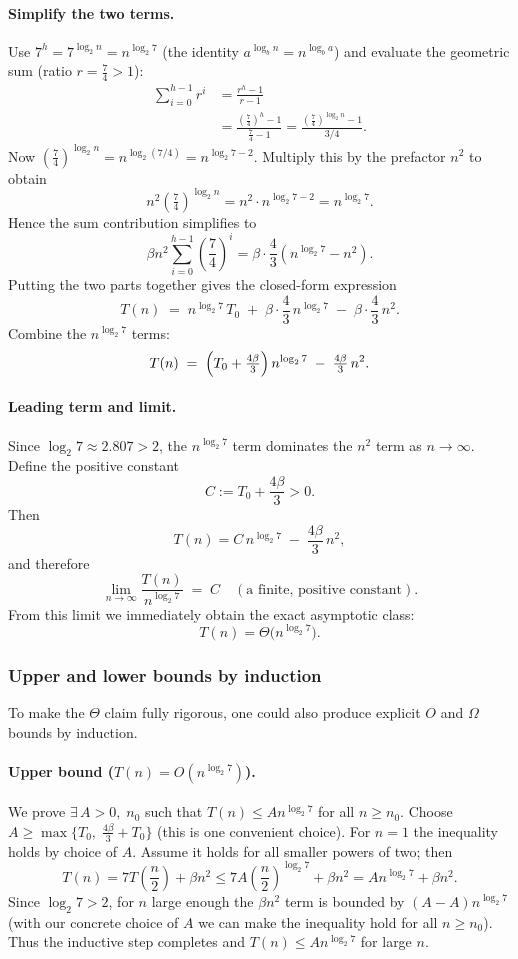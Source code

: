 \documentclass[11pt, a4paper, titlepage]{scrartcl}
\begin{document}
\paragraph{Simplify the two terms.}
Use $7^h = 7^{\log_2 n} = n^{\log_2 7}$ (the identity $a^{\log_b n}=n^{\log_b a}$) and evaluate the geometric sum (ratio $r=\tfrac{7}{4}>1$):
\begin{align*}
\sum_{i=0}^{h-1} r^i &= \frac{r^h - 1}{r-1} \\
&= \frac{\left(\tfrac{7}{4}\right)^h - 1}{\tfrac{7}{4}-1}
= \frac{ \left(\tfrac{7}{4}\right)^{\log_2 n} - 1 }{3/4}.
\end{align*}
Now $\left(\tfrac{7}{4}\right)^{\log_2 n} = n^{\log_2(7/4)} = n^{\log_2 7 - 2}$. Multiply this by the prefactor $n^2$ to obtain
\[
n^2 \left(\tfrac{7}{4}\right)^{\log_2 n} = n^2 \cdot n^{\log_2 7 - 2} = n^{\log_2 7}.
\]
Hence the sum contribution simplifies to
\[
\beta n^2 \sum_{i=0}^{h-1} \left(\frac{7}{4}\right)^i
= \beta \cdot \frac{4}{3}\!\left(n^{\log_2 7} - n^2\right).
\]
Putting the two parts together gives the closed-form expression
\[
T(n) \;=\; n^{\log_2 7}\,T_0 \;+\; \beta \cdot \frac{4}{3}\, n^{\log_2 7} \;-\; \beta \cdot \frac{4}{3}\, n^2 .
\]
Combine the $n^{\log_2 7}$ terms:
\[
T(n) \;=\; \Bigl(T_0 + \tfrac{4\beta}{3}\Bigr)\, n^{\log_2 7} \;-\; \tfrac{4\beta}{3}\, n^2 .
\]

\paragraph{Leading term and limit.}
Since $\log_2 7 \approx 2.807 > 2$, the $n^{\log_2 7}$ term dominates the $n^2$ term as $n\to\infty$. Define the positive constant
\[
C := T_0 + \frac{4\beta}{3} > 0.
\]
Then
\[
T(n) = C\, n^{\log_2 7} \;-\; \frac{4\beta}{3}\, n^2,
\]
and therefore
\[
\lim_{n\to\infty} \frac{T(n)}{n^{\log_2 7}} \;=\; C \quad(\text{a finite, positive constant}).
\]
From this limit we immediately obtain the exact asymptotic class:
\[
T(n) = \Theta\!\bigl(n^{\log_2 7}\bigr).
\]

\subsubsection{Upper and lower bounds by induction}
To make the $\Theta$ claim fully rigorous, one could also produce explicit $O$ and $\Omega$ bounds by induction.

\paragraph{Upper bound ($T(n)=O(n^{\log_2 7})$).}  
We prove $\exists\,A>0,\; n_0$ such that $T(n)\le A n^{\log_2 7}$ for all $n\ge n_0$.
Choose $A \ge \max\{T_0,\; \tfrac{4\beta}{3} + T_0\}$ (this is one convenient choice). For $n=1$ the inequality holds by choice of $A$. Assume it holds for all smaller powers of two; then
\[
T(n) = 7 T\!\left(\frac{n}{2}\right) + \beta n^2
\le 7 A\left(\frac{n}{2}\right)^{\log_2 7} + \beta n^2
= A n^{\log_2 7} + \beta n^2.
\]
Since $\log_2 7>2$, for $n$ large enough the $\beta n^2$ term is bounded by $(A-A) n^{\log_2 7}$ (with our concrete choice of $A$ we can make the inequality hold for all $n\ge n_0$). Thus the inductive step completes and $T(n)\le A n^{\log_2 7}$ for large $n$.
\end{document}
